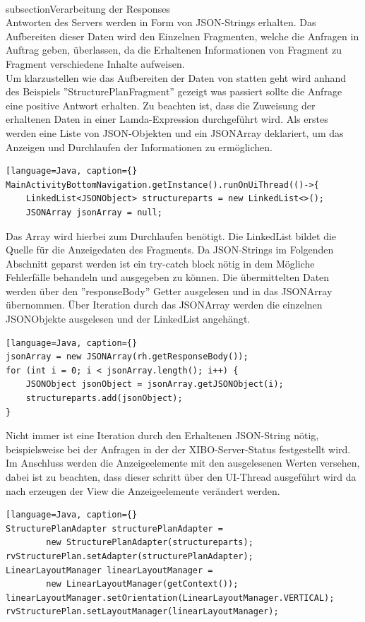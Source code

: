 \\subsection{Verarbeitung der Responses}
\\
Antworten des Servers werden in Form von JSON-Strings erhalten. Das Aufbereiten dieser Daten wird den Einzelnen Fragmenten, welche die Anfragen in Auftrag geben, überlassen, da die Erhaltenen Informationen von Fragment zu Fragment verschiedene Inhalte aufweisen. 
\\
Um klarzustellen wie das Aufbereiten der Daten von statten geht wird anhand des Beispiels ''StructurePlanFragment'' gezeigt was passiert sollte die Anfrage eine positive Antwort erhalten. Zu beachten ist, dass die Zuweisung der erhaltenen Daten in einer Lamda-Expression durchgeführt wird. Als erstes werden eine Liste von JSON-Objekten und ein JSONArray deklariert, um das Anzeigen und Durchlaufen der Informationen zu ermöglichen.
\begin{lstlisting}[language=Java, caption={}
MainActivityBottomNavigation.getInstance().runOnUiThread(()->{
	LinkedList<JSONObject> structureparts = new LinkedList<>();
    JSONArray jsonArray = null;
\end{lstlisting}
Das Array wird hierbei zum Durchlaufen benötigt. Die LinkedList bildet die Quelle für die Anzeigedaten des Fragments. Da JSON-Strings im Folgenden Abschnitt geparst werden ist ein try-catch block nötig in dem Mögliche Fehlerfälle behandeln und ausgegeben zu können. Die übermittelten Daten werden über den ''responseBody'' Getter ausgelesen und in das JSONArray übernommen. Über Iteration durch das JSONArray werden die einzelnen JSONObjekte ausgelesen und der LinkedList angehängt.
\begin{lstlisting}[language=Java, caption={}
jsonArray = new JSONArray(rh.getResponseBody());
for (int i = 0; i < jsonArray.length(); i++) {
	JSONObject jsonObject = jsonArray.getJSONObject(i);
	structureparts.add(jsonObject);
}
\end{lstlisting}
 Nicht immer ist eine Iteration durch den Erhaltenen JSON-String nötig, beispielsweise bei der Anfragen in der der XIBO-Server-Status festgestellt wird. Im Anschluss werden die Anzeigeelemente mit den ausgelesenen Werten versehen, dabei ist zu beachten, dass dieser schritt über den UI-Thread ausgeführt wird da nach erzeugen der View die Anzeigeelemente verändert werden. 
 \begin{lstlisting}[language=Java, caption={}
StructurePlanAdapter structurePlanAdapter = 
	 	new StructurePlanAdapter(structureparts);
rvStructurePlan.setAdapter(structurePlanAdapter);
LinearLayoutManager linearLayoutManager = 
		new LinearLayoutManager(getContext());
linearLayoutManager.setOrientation(LinearLayoutManager.VERTICAL);
rvStructurePlan.setLayoutManager(linearLayoutManager);
\end{lstlisting}
\\